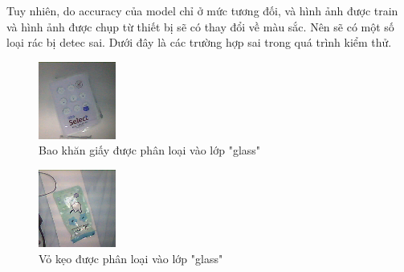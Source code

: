Tuy nhiên, do accuracy của model chỉ ở mức tương đối, và hình ảnh được train và hình ảnh được chụp từ thiết bị sẽ có thay đổi về màu sắc. Nên sẽ có một số loại rác bị detec sai. Dưới đây là các trường hợp sai trong quá trình kiểm thử.
\begin{figure}[H]
    \centering
    \includegraphics[width=\linewidth]{images/Quanh/glass.bmp}
    \caption{ Bao khăn giấy được phân loại vào lớp "glass" }
    \label{fig:DWglass}
\end{figure}

\begin{figure}[H]
    \centering
    \includegraphics[width=\linewidth]{images/Quanh/glassw.bmp}
    \caption{ Vỏ kẹo được phân loại vào lớp "glass" }
    \label{fig:DWglass2}
\end{figure}

